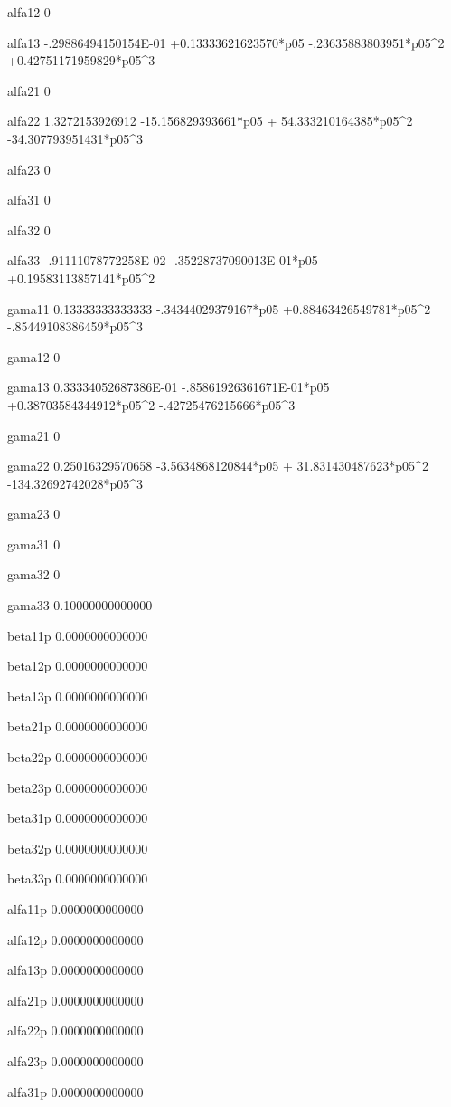  alfa12 
 0 
  
 alfa13 
  -.29886494150154E-01 +0.13333621623570*p05  -.23635883803951*p05^2 +0.42751171959829*p05^3 
  
 alfa21 
 0 
  
 alfa22 
   1.3272153926912  -15.156829393661*p05 + 54.333210164385*p05^2  -34.307793951431*p05^3 
  
 alfa23 
 0 
  
 alfa31 
 0 
  
 alfa32 
 0 
  
 alfa33 
  -.91111078772258E-02  -.35228737090013E-01*p05 +0.19583113857141*p05^2 
  
 gama11 
  0.13333333333333  -.34344029379167*p05 +0.88463426549781*p05^2  -.85449108386459*p05^3 
  
 gama12 
 0 
  
 gama13 
  0.33334052687386E-01  -.85861926361671E-01*p05 +0.38703584344912*p05^2  -.42725476215666*p05^3 
  
 gama21 
 0 
  
 gama22 
  0.25016329570658  -3.5634868120844*p05 + 31.831430487623*p05^2  -134.32692742028*p05^3 
  
 gama23 
 0 
  
 gama31 
 0 
  
 gama32 
 0 
  
 gama33 
  0.10000000000000 
  
 beta11p
   0.0000000000000 
  
 beta12p
   0.0000000000000 
  
 beta13p
   0.0000000000000 
  
 beta21p
   0.0000000000000 
  
 beta22p
   0.0000000000000 
  
 beta23p
   0.0000000000000 
  
 beta31p
   0.0000000000000 
  
 beta32p
   0.0000000000000 
  
 beta33p
   0.0000000000000 
  
 alfa11p
   0.0000000000000 
  
 alfa12p
   0.0000000000000 
  
 alfa13p
   0.0000000000000 
  
 alfa21p
   0.0000000000000 
  
 alfa22p
   0.0000000000000 
  
 alfa23p
   0.0000000000000 
  
 alfa31p
   0.0000000000000 
  
